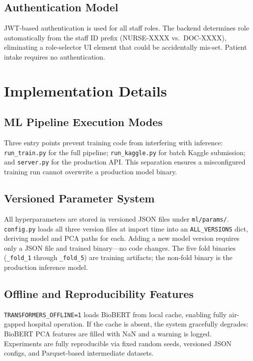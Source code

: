 \documentclass[conference]{IEEEtran}
\begin{document}
\subsection{Authentication Model}
JWT-based authentication is used for all staff roles. The backend determines role automatically from the staff ID prefix (NURSE-XXXX vs.\ DOC-XXXX), eliminating a role-selector UI element that could be accidentally mis-set. Patient intake requires no authentication.

\section{Implementation Details}

\subsection{ML Pipeline Execution Modes}
Three entry points prevent training code from interfering with inference: \texttt{run\_train.py} for the full pipeline; \texttt{run\_kaggle.py} for batch Kaggle submission; and \texttt{server.py} for the production API. This separation ensures a misconfigured training run cannot overwrite a production model binary.

\subsection{Versioned Parameter System}
All hyperparameters are stored in versioned JSON files under \texttt{ml/params/}. \texttt{config.py} loads all three version files at import time into an \texttt{ALL\_VERSIONS} dict, deriving model and PCA paths for each. Adding a new model version requires only a JSON file and trained binary---no code changes. The five fold binaries (\texttt{\_fold\_1} through \texttt{\_fold\_5}) are training artifacts; the non-fold binary is the production inference model.

\subsection{Offline and Reproducibility Features}
\texttt{TRANSFORMERS\_OFFLINE=1} loads BioBERT from local cache, enabling fully air-gapped hospital operation. If the cache is absent, the system gracefully degrades: BioBERT PCA features are filled with NaN and a warning is logged. Experiments are fully reproducible via fixed random seeds, versioned JSON configs, and Parquet-based intermediate datasets.
\end{document}
